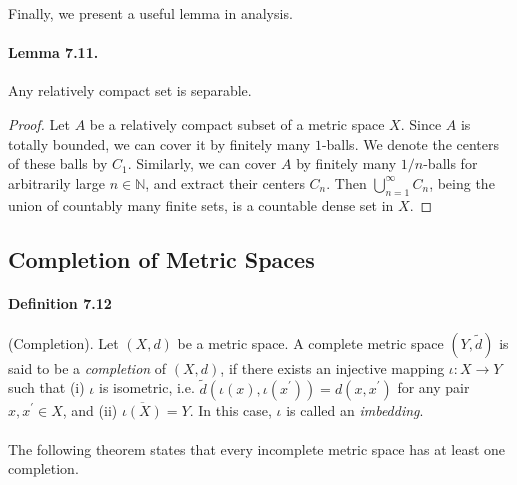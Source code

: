 \documentclass{article}
\numberwithin{equation}{section}
\theoremstyle{plain}
\theoremstyle{definition}
\begin{document}
Finally, we present a useful lemma in analysis.
\paragraph{Lemma 7.11.\label{lemma:7.11}} Any relatively compact set is separable.
\begin{proof}
Let $A$ be a relatively compact subset of a metric space $X$. Since $A$ is totally bounded, we can cover it by finitely many $1$-balls. We denote the centers of these balls by $C_1$. Similarly, we can cover $A$ by finitely many $1/n$-balls for arbitrarily large $n\in\mathbb{N}$, and extract their centers $C_n$. Then $\bigcup_{n=1}^\infty C_n$, being the union of countably many finite sets, is a countable dense set in $X$.
\end{proof}

\subsection{Completion of Metric Spaces}
\paragraph{Definition 7.12\label{def:7.12}} (Completion). Let $(X,d)$ be a metric space. A complete metric space $(Y,\tilde{d})$ is said to be a \textit{completion} of $(X,d)$, if there exists an injective mapping $\iota:X\to Y$ such that (i) $\iota$ is isometric, i.e. $\tilde{d}(\iota(x),\iota(x^\prime))=d(x,x^\prime)$ for any pair $x,x^\prime\in X$, and (ii) $\overline{\iota(X)}=Y$. In this case, $\iota$ is called an \textit{imbedding}.

\paragraph{} The following theorem states that every incomplete metric space has at least one completion.
\end{document}
